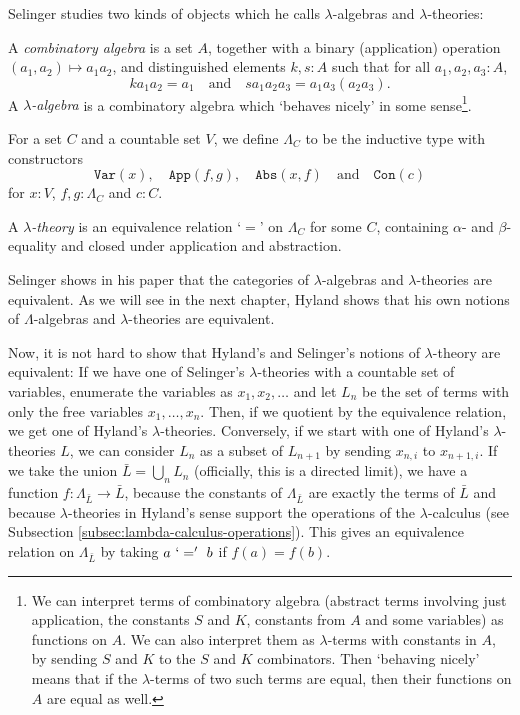 Selinger studies two kinds of objects which he calls $ \lambda $-algebras and $ \lambda $-theories:
\begin{definition}
  A \textit{combinatory algebra} is a set $ A $, together with a binary (application) operation $ (a_1, a_2) \mapsto a_1 a_2 $, and distinguished elements $ k, s : A $ such that for all $ a_1, a_2, a_3 : A $,
  \[ k a_1 a_2 = a_1 \quad \text{and} \quad s a_1 a_2 a_3 = a_1 a_3 (a_2 a_3). \]
  A \textit{$ \lambda $-algebra} is a combinatory algebra which `behaves nicely' in some sense\footnote{We can interpret terms of combinatory algebra (abstract terms involving just application, the constants $ S $ and $ K $, constants from $ A $ and some variables) as functions on $ A $. We can also interpret them as $ \lambda $-terms with constants in $ A $, by sending $ S $ and $ K $ to the $ S $ and $ K $ combinators. Then `behaving nicely' means that if the $ \lambda $-terms of two such terms are equal, then their functions on $ A $ are equal as well.}.
\end{definition}

For a set $ C $ and a countable set $ V $, we define $ \Lambda_C $ to be the inductive type with constructors
\[ \mathtt{Var}(x), \quad \mathtt{App}(f, g), \quad \mathtt{Abs}(x, f) \quad \text{and} \quad \mathtt{Con}(c) \]
for $ x : V $, $ f, g : \Lambda_C $ and $ c : C $.
\begin{definition}
  A \textit{$ \lambda $-theory} is an equivalence relation `$ = $' on $ \Lambda_C $ for some $ C $, containing $ \alpha $- and $ \beta $-equality and closed under application and abstraction.
\end{definition}

Selinger shows in his paper that the categories of $ \lambda $-algebras and $ \lambda $-theories are equivalent. As we will see in the next chapter, Hyland shows that his own notions of $ \Lambda $-algebras and $ \lambda $-theories are equivalent.

Now, it is not hard to show that Hyland's and Selinger's notions of $ \lambda $-theory are equivalent: If we have one of Selinger's $ \lambda $-theories with a countable set of variables, enumerate the variables as $ x_1, x_2, \dots $ and let $ L_n $ be the set of terms with only the free variables $ x_1, \dots, x_n $. Then, if we quotient by the equivalence relation, we get one of Hyland's $ \lambda $-theories. Conversely, if we start with one of Hyland's $ \lambda $-theories $ L $, we can consider $ L_n $ as a subset of $ L_{n + 1} $ by sending $ x_{n, i} $ to $ x_{n + 1, i} $. If we take the union $ \bar L = \bigcup_n L_n $ (officially, this is a directed limit), we have a function $ f: \Lambda_{\bar L} \to \bar L $, because the constants of $ \Lambda_{\bar L} $ are exactly the terms of $ \bar L $ and because $ \lambda $-theories in Hyland's sense support the operations of the $ \lambda $-calculus (see Subsection \ref{subsec:lambda-calculus-operations}). This gives an equivalence relation on $ \Lambda_{\bar L} $ by taking $ a\ `='\ b $ if $ f(a) = f(b) $.


